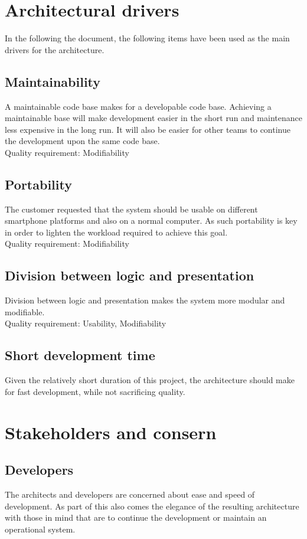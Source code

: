 \documentclass[11pt]{book}
\begin{document}
\section{Architectural drivers}
In the following the document, the following items have been used as the main drivers for the architecture.

\subsection{Maintainability}
A maintainable code base makes for a developable code base. Achieving a maintainable base will make development easier in the short run and maintenance less expensive in the long run. It will also be easier for other teams to continue the development upon the same code base.\\
Quality requirement: Modifiability

\subsection{Portability}
The customer requested that the system should be usable on different smartphone platforms and also on a normal computer. As such portability is key in order to lighten the workload required to achieve this goal.\\
Quality requirement: Modifiability

\subsection{Division between logic and presentation}
Division between logic and presentation makes the system more modular and modifiable.\\
Quality requirement: Usability, Modifiability

\subsection{Short development time}
Given the relatively short duration of this project, the architecture should make for fast development, while not sacrificing quality.

\section{Stakeholders and consern}

\subsection{Developers}
The architects and developers are concerned about ease and speed of development. As part of this also comes the elegance of the resulting architecture with those in mind that are to continue the development or maintain an operational system.
\end{document}
